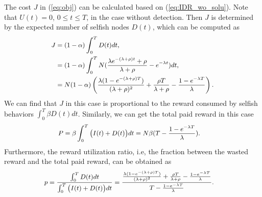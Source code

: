 The cost $J$ in (\ref{eq:obj}) can be
calculated based on (\ref{eq:IDR_wo_solu}).
Note that $U(t)=0$, $0 \le t \le T$,
in the case without detection.
Then $J$ is determined by the expected number of selfish nodes $D(t)$,
which can be computed as
\begin{equation}
\begin{small}
\label{eq:IDR_wo_J}
\begin{aligned}
J &= (1-\alpha) \int_{0}^{T} D(t) dt, \\
&= (1-\alpha) \int_{0}^{T} N (\frac{\lambda e^{-(\lambda + \rho)t}
+ \rho}{ \lambda + \rho } - e^{- \lambda t}) dt, \\
&= N (1-\alpha) \left( \frac{\lambda (1-e^{-(\lambda+\rho)T})}
{ (\lambda + \rho)^{2} }
+ \frac{\rho T}{\lambda + \rho}
- \frac{1-e^{-\lambda T}}{\lambda} \right).
\end{aligned}
\end{small}
\end{equation}
We can find that $J$ in this case
is proportional to the reward consumed
by selfish behaviors $\int_{0}^{T} \beta D(t) dt$.
Similarly, we can get the total paid reward in this case
\begin{equation}
\begin{small}
\nonumber
\begin{aligned}
P &= \beta \int_{0}^{T} \big( I(t) + D(t) \big) dt
= N \beta (T - \frac{ 1 - e^{-\lambda T} }{\lambda} ).
\end{aligned}
\end{small}
\end{equation}
Furthermore, the reward utilization ratio,
i.e, the fraction between the wasted reward and the total paid reward, 
can be obtained as
\begin{equation}
\begin{small}
\nonumber
\begin{aligned}
p = \frac{\int_{0}^{T} D(t) dt}{\int_{0}^{T} 
\big( I(t) + D(t) \big) dt}
&= \frac{ \frac{\lambda (1-e^{-(\lambda+\rho)T})}
{ (\lambda + \rho)^{2} }
+ \frac{\rho T}{\lambda + \rho}
- \frac{1-e^{-\lambda T}}{\lambda} }
{T - \frac{ 1 - e^{-\lambda T} }{\lambda} }.
\end{aligned}
\end{small}
\end{equation}

